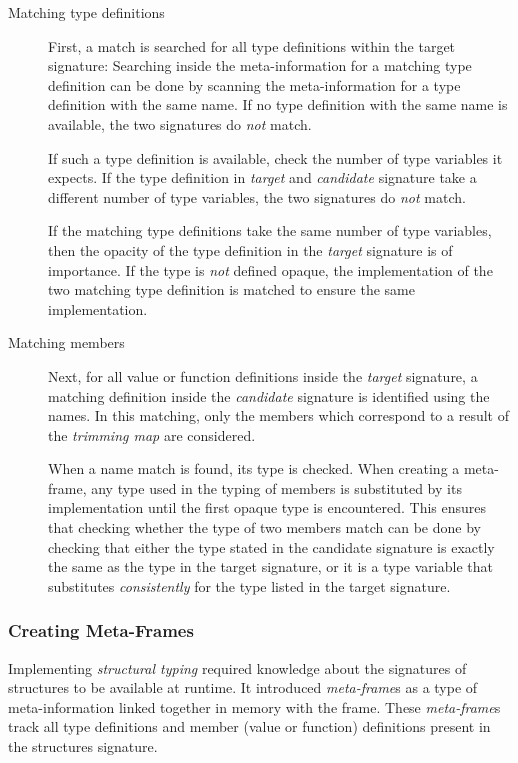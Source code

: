 \begin{description}
\item[Matching type definitions]
First, a match is searched for all type definitions within the target signature:
Searching inside the meta-information for a matching type definition can be done by scanning the meta-information for a type definition with the same name.
If no type definition with the same name is available, the two signatures do \emph{not} match.

If such a type definition is available, check the number of type variables  it expects.
If the type definition in \emph{target} and \emph{candidate} signature take a different number of type variables, the two signatures do \emph{not} match.

If the matching type definitions take the same number of type variables, then the opacity of the type definition in the \emph{target} signature is of importance. If the type is \emph{not} defined opaque, the implementation of the two matching type definition is matched to ensure the same implementation.
\item[Matching members]
Next, for all value or function definitions inside the \emph{target} signature, a matching definition inside the \emph{candidate} signature is identified using the names.
In this matching, only the members which correspond to a result of the \emph{trimming map} are considered.

When a name match is found, its type is checked.
When creating a meta-frame, any type used in the typing of members is substituted by its implementation until the first opaque type is encountered.
This ensures that checking whether the type of two members match can be done by checking that either the type stated in the candidate signature is exactly the same as the type in the target signature, or it is a type variable that substitutes \emph{consistently} for the type listed in the target signature.
\end{description}

\subsubsection{Creating Meta-Frames}
Implementing \emph{structural typing} required knowledge about the signatures of structures to be available at runtime.
It introduced \emph{meta-frame}s as a type of meta-information linked together in memory with the frame.
These \emph{meta-frame}s track all type definitions and member (value or function) definitions present in the structures signature.

